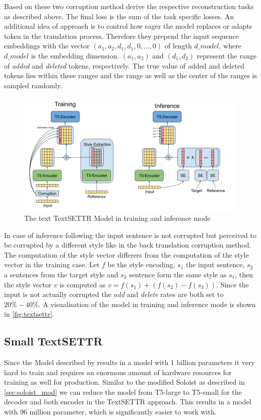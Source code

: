 \documentclass[twocolumn]{tum-article}
\begin{document}
Based on these two corruption method \cite{riley2020textsettr} derive the respective reconstruction tasks as described above. The final loss is the sum of the task specific losses. 
An additional idea of \cite{riley2020textsettr} approach is to control how eager the model replaces or adapts token in the translation process. Therefore they prepend the input sequence embeddings with the vector $(a_1, a_2, d_1, d_1, 0, \dots, 0)$ of length $d\_model$, where $d\_model$ is the embedding dimension. $(a_1, a_2)$ and $(d_1, d_2)$ represent the range of \textit{added} and \textit{deleted} tokens, respectively. The true value of added and deleted tokens lies within these ranges and the range as well as the center of the ranges is sampled randomly.\\
\begin{figure}[!h]
\centering
\includegraphics[width=\textwidth]{figures/TextSETTR.png}
\caption{The text TextSETTR Model \cite{riley2020textsettr} in training and inference mode}
\label{fig:textsettr}
\end{figure}
In case of inference following \cite{riley2020textsettr} the input sentence is not corrupted but perceived to be corrupted by a different style like in the back translation corruption method. The computation of the style vector differers from the computation of the style vector in the training case. Let $f$ be the style encoding, $s_1$ the input sentence, $s_2$ a sentences from the target style and $s_3$ sentence form the same style as $s_1$, then the style vector $v$ is computed as $v = f(s_1) + (f(s_2) - f(s_3))$. Since the input is not actually corrupted the \textit{add} and \textit{delete} rates are both set to $20\%-40\%$. A visualisation of the model in training and inference mode is shown in \autoref{fig:textsettr}.
\subsection{Small TextSETTR}\label{sec:textsettr_small}
Since the Model described by \cite{riley2020textsettr} results in a model with 1 billion parameters it very hard to train and requires an enormous amount of hardware resources for training as well for production. Similar to the modified Soloist as described in \autoref{sec:soloist_mod} we can reduce the model from T5-large to T5-small for the decoder and both encoder in the TextSETTR approach. This results in a model with $96$ million parameter, which is significantly easier to work with. 
\end{document}
